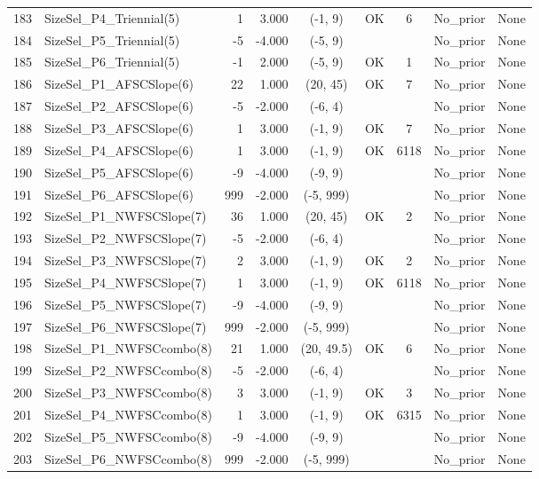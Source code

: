 \documentclass[12pt,]{article}
\begin{document}
\begin{landscape}
\begin{longtable}{rlrrcccll}
  183 & SizeSel\_P4\_Triennial(5) & 1 & 3.000 & (-1, 9) & OK & 6 & No\_prior & None \\ 
  184 & SizeSel\_P5\_Triennial(5) & -5 & -4.000 & (-5, 9) &  &  & No\_prior & None \\ 
  185 & SizeSel\_P6\_Triennial(5) & -1 & 2.000 & (-5, 9) & OK & 1 & No\_prior & None \\ 
  186 & SizeSel\_P1\_AFSCSlope(6) & 22 & 1.000 & (20, 45) & OK & 7 & No\_prior & None \\ 
  187 & SizeSel\_P2\_AFSCSlope(6) & -5 & -2.000 & (-6, 4) &  &  & No\_prior & None \\ 
  188 & SizeSel\_P3\_AFSCSlope(6) & 1 & 3.000 & (-1, 9) & OK & 7 & No\_prior & None \\ 
  189 & SizeSel\_P4\_AFSCSlope(6) & 1 & 3.000 & (-1, 9) & OK & 6118 & No\_prior & None \\ 
  190 & SizeSel\_P5\_AFSCSlope(6) & -9 & -4.000 & (-9, 9) &  &  & No\_prior & None \\ 
  191 & SizeSel\_P6\_AFSCSlope(6) & 999 & -2.000 & (-5, 999) &  &  & No\_prior & None \\ 
  192 & SizeSel\_P1\_NWFSCSlope(7) & 36 & 1.000 & (20, 45) & OK & 2 & No\_prior & None \\ 
  193 & SizeSel\_P2\_NWFSCSlope(7) & -5 & -2.000 & (-6, 4) &  &  & No\_prior & None \\ 
  194 & SizeSel\_P3\_NWFSCSlope(7) & 2 & 3.000 & (-1, 9) & OK & 2 & No\_prior & None \\ 
  195 & SizeSel\_P4\_NWFSCSlope(7) & 1 & 3.000 & (-1, 9) & OK & 6118 & No\_prior & None \\ 
  196 & SizeSel\_P5\_NWFSCSlope(7) & -9 & -4.000 & (-9, 9) &  &  & No\_prior & None \\ 
  197 & SizeSel\_P6\_NWFSCSlope(7) & 999 & -2.000 & (-5, 999) &  &  & No\_prior & None \\ 
  198 & SizeSel\_P1\_NWFSCcombo(8) & 21 & 1.000 & (20, 49.5) & OK & 6 & No\_prior & None \\ 
  199 & SizeSel\_P2\_NWFSCcombo(8) & -5 & -2.000 & (-6, 4) &  &  & No\_prior & None \\ 
  200 & SizeSel\_P3\_NWFSCcombo(8) & 3 & 3.000 & (-1, 9) & OK & 3 & No\_prior & None \\ 
  201 & SizeSel\_P4\_NWFSCcombo(8) & 1 & 3.000 & (-1, 9) & OK & 6315 & No\_prior & None \\ 
  202 & SizeSel\_P5\_NWFSCcombo(8) & -9 & -4.000 & (-9, 9) &  &  & No\_prior & None \\ 
  203 & SizeSel\_P6\_NWFSCcombo(8) & 999 & -2.000 & (-5, 999) &  &  & No\_prior & None \\ 

\end{longtable}
\end{landscape}
\end{document}
